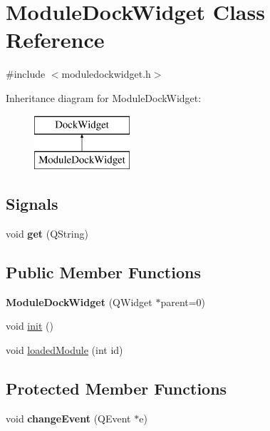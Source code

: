 \hypertarget{classModuleDockWidget}{
\section{ModuleDockWidget Class Reference}
\label{classModuleDockWidget}
}


{\ttfamily \#include $<$moduledockwidget.h$>$}

Inheritance diagram for ModuleDockWidget:\begin{figure}[H]
\begin{center}
\leavevmode
\includegraphics[height=2cm]{classModuleDockWidget}
\end{center}
\end{figure}
\subsection*{Signals}
\begin{DoxyCompactItemize}
\item 
\hypertarget{classModuleDockWidget_aa784306e1a4fcf56569177dcaef96b25}{
void {\bfseries get} (QString)}
\label{classModuleDockWidget_aa784306e1a4fcf56569177dcaef96b25}

\end{DoxyCompactItemize}
\subsection*{Public Member Functions}
\begin{DoxyCompactItemize}
\item 
\hypertarget{classModuleDockWidget_a864ef7e5df97d96feb92f67a401c0d6b}{
{\bfseries ModuleDockWidget} (QWidget $\ast$parent=0)}
\label{classModuleDockWidget_a864ef7e5df97d96feb92f67a401c0d6b}

\item 
void \hyperlink{classModuleDockWidget_acdce295969ddf4230362ccc87bc8be42}{init} ()
\item 
void \hyperlink{classModuleDockWidget_adacdb1e6fbfb1f3be9537dfc8adc2ec9}{loadedModule} (int id)
\end{DoxyCompactItemize}
\subsection*{Protected Member Functions}
\begin{DoxyCompactItemize}
\item 
\hypertarget{classModuleDockWidget_a6db5d10ff32c3494d88ddfb5dca7d942}{
void {\bfseries changeEvent} (QEvent $\ast$e)}
\label{classModuleDockWidget_a6db5d10ff32c3494d88ddfb5dca7d942}

\end{DoxyCompactItemize}


